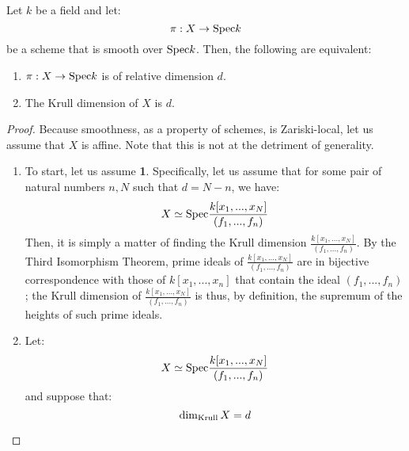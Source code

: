             \begin{proposition} \label{prop: dimensions_of_smoothn_morphisms_over_fields}
                Let $k$ be a field and let:
                    $$\pi: X \to \mathrm{Spec} k$$
                be a scheme that is smooth over $\mathrm{Spec} k$. Then, the following are equivalent:
                    \begin{enumerate}
                        \item $\pi: X \to \mathrm{Spec} k$ is of relative dimension $d$. 
                        \item The Krull dimension of $X$ is $d$. 
                    \end{enumerate}
            \end{proposition}
                \begin{proof}
                    Because smoothness, as a property of schemes, is Zariski-local, let us assume that $X$ is affine. Note that this is not at the detriment of generality. 
                    \begin{enumerate}
                        \item To start, let us assume \textbf{1}. Specifically, let us assume that for some pair of natural numbers $n, N$ such that $d = N - n$, we have:
                            $$X \simeq \mathrm{Spec} \frac{k[x_1, ..., x_N]}{(f_1, ...,f_n)}$$
                        Then, it is simply a matter of finding the Krull dimension $\frac{k[x_1, ..., x_N]}{(f_1, ...,f_n)}$. By the Third Isomorphism Theorem, prime ideals of $\frac{k[x_1, ..., x_N]}{(f_1, ...,f_n)}$ are in bijective correspondence with those of $k[x_1, ..., x_n]$ that contain the ideal $(f_1, ..., f_n)$; the Krull dimension of $\frac{k[x_1, ..., x_N]}{(f_1, ...,f_n)}$ is thus, by definition, the supremum of the heights of such prime ideals. 
                        \item Let:
                            $$X \simeq \mathrm{Spec} \frac{k[x_1, ..., x_N]}{(f_1, ..., f_n)}$$
                        and suppose that:
                            $$\dim_{\mathrm{Krull}} X = d$$
                        
                    \end{enumerate}
                \end{proof}